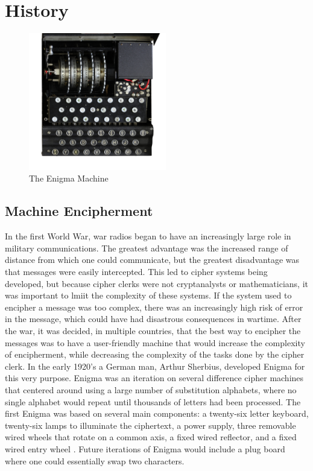 \chapter{History}\label{chap:history}

\begin{figure}[h!]
\begin{centering}
  \includegraphics[height=6cm]{images/enigma.jpg}
  \caption{The Enigma Machine}
  \label{fig:machine1}
\end{centering}
\end{figure}

\section{Machine Encipherment}
In the first World War, war radios began to have an increasingly large role in military communications. The greatest advantage was the increased range of distance from which one could communicate, but the greatest disadvantage was that messages were easily intercepted. This led to cipher systems being developed, but because cipher clerks were not cryptanalysts or mathematicians, it was important to lmiit the complexity of these systems. If the system used to encipher a message was too complex, there was an increasingly high risk of error in the message, which could have had disastrous consequences in wartime. After the war, it was decided, in multiple countries, that the best way to encipher the messages was to have a user-friendly machine that would increase the complexity of encipherment, while decreasing the complexity of the tasks done by the cipher clerk. In the early 1920’s a German man, Arthur Sherbius, developed Enigma for this very purpose. Enigma was an iteration on several difference cipher machines that centered around using a large number of substitution alphabets, where no single alphabet would repeat until thousands of letters had been processed. The first Enigma was based on several main components: a twenty-six letter keyboard, twenty-six lamps to illuminate the ciphertext, a power supply, three removable wired wheels that rotate on a common axis, a fixed wired reflector, and a fixed wired entry wheel \cite{rfc01}. Future iterations of Enigma would include a plug board where one could essentially swap two characters.

